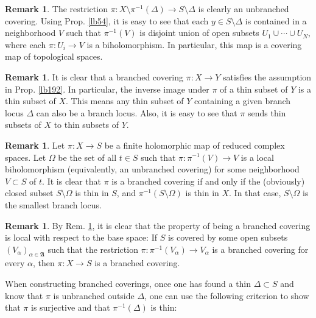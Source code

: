 \documentclass[12pt,b5paper,notitlepage]{report}
\theoremstyle{definition}
\newtheorem{rem}[df]{Remark}
\theoremstyle{plain}
\newcommand{\fk}{\mathfrak}
\numberwithin{equation}{section}
\begin{document}
\begin{rem}
The restriction $\pi:X\setminus\pi^{-1}(\Delta)\rightarrow S\setminus \Delta$ is clearly an unbranched covering. Using Prop. \ref{lb54}, it is easy to see that each $y\in S\setminus \Delta$ is contained in a neighborhood $V$ such that $\pi^{-1}(V)$ is disjoint union of open subsets $U_1\cup\cdots\cup U_N$, where each $\pi:U_i\rightarrow V$ is a biholomorphism. In particular, this map is a covering map of topological spaces.
\end{rem}


\begin{rem}\label{lb209}
It is clear that a branched covering $\pi:X\rightarrow Y$ satisfies the assumption in Prop. \ref{lb192}. In particular, the inverse image under $\pi$ of a thin subset of $Y$ is a thin subset of $X$. This means any thin subset of $Y$ containing a given branch locus $\Delta$ can also be a branch locus. Also, it is easy to see that $\pi$ sends thin subsets of $X$ to thin subsets of $Y$.   
\end{rem}


\begin{rem}\label{lb199}
Let $\pi:X\rightarrow S$ be a finite holomorphic map of reduced complex spaces. Let $\Omega$ be the set of all $t\in S$ such that $\pi:\pi^{-1}(V)\rightarrow V$ is a local biholomorphism (equivalently, an unbranched covering) for some neighborhood $V\subset S$ of $t$. It is clear that $\pi$ is a branched covering if and only if the (obviously) closed subset $S\setminus\Omega$ is thin in $S$, and $\pi^{-1}(S\setminus\Omega)$ is thin in $X$. In that case, $S\setminus\Omega$ is the smallest branch locus.
\end{rem}


\begin{rem}\label{lb200}
By Rem. \ref{lb199}, it is clear that the property of being a branched covering is local with respect to the base space: If $S$ is covered by some open subsets $(V_\alpha)_{\alpha\in\fk A}$ such that the restriction $\pi:\pi^{-1}(V_\alpha)\rightarrow V_\alpha$ is a branched covering for every $\alpha$, then $\pi:X\rightarrow S$ is a branched covering.
\end{rem}

When constructing branched coverings, once one has found a thin $\Delta\subset S$ and know that $\pi$ is unbranched outside $\Delta$, one can use the following criterion to show that $\pi$ is surjective and that $\pi^{-1}(\Delta)$ is thin:
\end{document}
